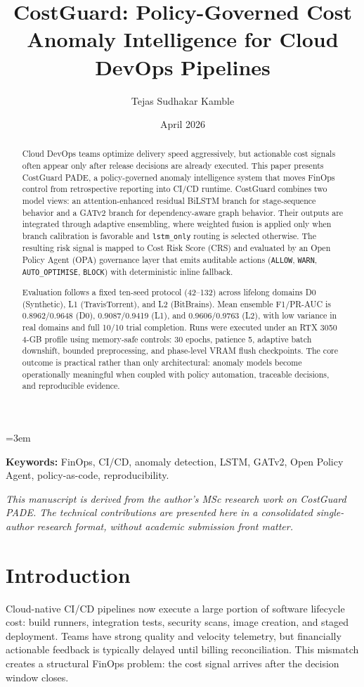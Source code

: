 \documentclass[10pt,twocolumn]{article}
\title{CostGuard: Policy-Governed Cost Anomaly Intelligence for Cloud DevOps Pipelines}
\author{Tejas Sudhakar Kamble}
\date{April 2026}
\begin{document}
\maketitle

\setlength{\columnsep}{0.24in}
\sloppy
\emergencystretch=3em
\raggedbottom

\begin{abstract}
Cloud DevOps teams optimize delivery speed aggressively, but actionable cost signals often appear only after release decisions are already executed. This paper presents CostGuard PADE, a policy-governed anomaly intelligence system that moves FinOps control from retrospective reporting into CI/CD runtime. CostGuard combines two model views: an attention-enhanced residual BiLSTM branch for stage-sequence behavior and a GATv2 branch for dependency-aware graph behavior. Their outputs are integrated through adaptive ensembling, where weighted fusion is applied only when branch calibration is favorable and \texttt{lstm\_only} routing is selected otherwise. The resulting risk signal is mapped to Cost Risk Score (CRS) and evaluated by an Open Policy Agent (OPA) governance layer that emits auditable actions (\texttt{ALLOW}, \texttt{WARN}, \texttt{AUTO\_OPTIMISE}, \texttt{BLOCK}) with deterministic inline fallback.

Evaluation follows a fixed ten-seed protocol (42--132) across lifelong domains D0 (Synthetic), L1 (TravisTorrent), and L2 (BitBrains). Mean ensemble F1/PR-AUC is 0.8962/0.9648 (D0), 0.9087/0.9419 (L1), and 0.9606/0.9763 (L2), with low variance in real domains and full 10/10 trial completion. Runs were executed under an RTX 3050 4-GB profile using memory-safe controls: 30 epochs, patience 5, adaptive batch downshift, bounded preprocessing, and phase-level VRAM flush checkpoints. The core outcome is practical rather than only architectural: anomaly models become operationally meaningful when coupled with policy automation, traceable decisions, and reproducible evidence.
\end{abstract}

\noindent\textbf{Keywords:} FinOps, CI/CD, anomaly detection, LSTM, GATv2, Open Policy Agent, policy-as-code, reproducibility.

\medskip
\noindent\textit{This manuscript is derived from the author's MSc research work on CostGuard PADE. The technical contributions are presented here in a consolidated single-author research format, without academic submission front matter.}

\FloatBarrier
\section{Introduction}
Cloud-native CI/CD pipelines now execute a large portion of software lifecycle cost: build runners, integration tests, security scans, image creation, and staged deployment. Teams have strong quality and velocity telemetry, but financially actionable feedback is typically delayed until billing reconciliation. This mismatch creates a structural FinOps problem: the cost signal arrives after the decision window closes.
\end{document}
